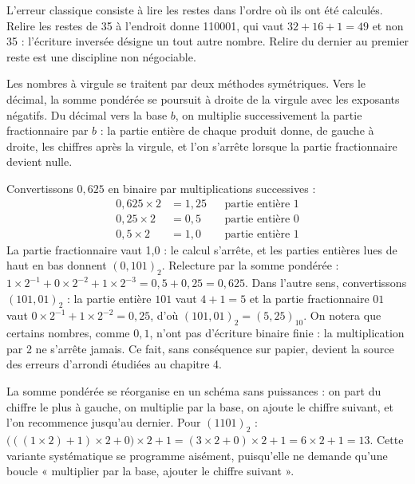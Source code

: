 \begin{attention}
L'erreur classique consiste à lire les restes dans l'ordre où ils ont été calculés. Relire les restes de 35 à l'endroit donne 110001, qui vaut $32 + 16 + 1 = 49$ et non 35 : l'écriture inversée désigne un tout autre nombre. Relire du dernier au premier reste est une discipline non négociable.
\end{attention}

Les nombres à virgule se traitent par deux méthodes symétriques. Vers le décimal, la somme pondérée se poursuit à droite de la virgule avec les exposants négatifs. Du décimal vers la base $b$, on multiplie successivement la partie fractionnaire par $b$ : la partie entière de chaque produit donne, de gauche à droite, les chiffres après la virgule, et l'on s'arrête lorsque la partie fractionnaire devient nulle.

\begin{exemple}
Convertissons $0{,}625$ en binaire par multiplications successives :
\begin{align*}
0{,}625 \times 2 &= 1{,}25 && \text{partie entière } 1\\
0{,}25 \times 2 &= 0{,}5 && \text{partie entière } 0\\
0{,}5 \times 2 &= 1{,}0 && \text{partie entière } 1
\end{align*}
La partie fractionnaire vaut 1{,}0 : le calcul s'arrête, et les parties entières lues de haut en bas donnent $(0{,}101)_2$. Relecture par la somme pondérée : $1 \times 2^{-1} + 0 \times 2^{-2} + 1 \times 2^{-3} = 0{,}5 + 0{,}25 = 0{,}625$. Dans l'autre sens, convertissons $(101{,}01)_2$ : la partie entière $101$ vaut $4 + 1 = 5$ et la partie fractionnaire $01$ vaut $0 \times 2^{-1} + 1 \times 2^{-2} = 0{,}25$, d'où $(101{,}01)_2 = (5{,}25)_{10}$. On notera que certains nombres, comme $0{,}1$, n'ont pas d'écriture binaire finie : la multiplication par 2 ne s'arrête jamais. Ce fait, sans conséquence sur papier, devient la source des erreurs d'arrondi étudiées au chapitre 4.
\end{exemple}

\begin{remarque}
La somme pondérée se réorganise en un schéma sans puissances : on part du chiffre le plus à gauche, on multiplie par la base, on ajoute le chiffre suivant, et l'on recommence jusqu'au dernier. Pour $(1101)_2$ : $\bigl(((1\times 2)+1)\times 2+0\bigr)\times 2+1 = (3\times 2+0)\times 2+1 = 6\times 2+1 = 13$. Cette variante systématique se programme aisément, puisqu'elle ne demande qu'une boucle « multiplier par la base, ajouter le chiffre suivant ».
\end{remarque}

